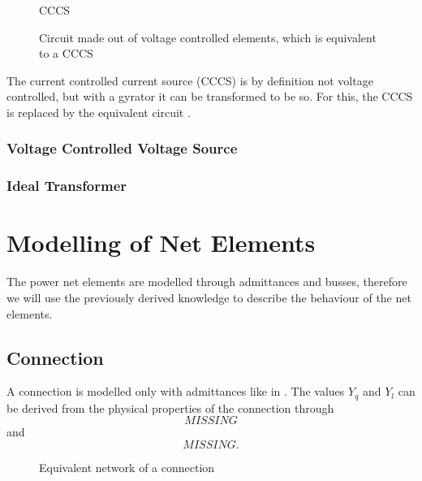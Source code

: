 \begin{figure}
	\centering
	
	\caption{CCCS}
	\label{fig:cccs_original}
\end{figure}

\begin{figure}
	\centering
	
	\caption{Circuit made out of voltage controlled elements, which is equivalent to a CCCS}
	\label{fig:cccs_equivalent}
\end{figure}

The current controlled current source (CCCS) is by definition not voltage controlled, but with a gyrator it can be transformed to be so. For this, the CCCS  is replaced by the equivalent circuit .

\subsubsection{Voltage Controlled Voltage Source}

\subsubsection{Ideal Transformer}

\section{Modelling of Net Elements}

The power net elements are modelled through admittances and busses, therefore we will use the previously derived knowledge to describe the behaviour of the net elements.

\subsection{Connection}
A connection is modelled only with admittances like in . The values $Y_q$ and $Y_l$ can be derived from the physical properties of the connection through
\begin{equation}
	MISSING
\end{equation}
and
\begin{equation}
	MISSING.
\end{equation}

\begin{figure}
	\centering
	
	\caption{Equivalent network of a connection}
	\label{fig:connection}
\end{figure}

